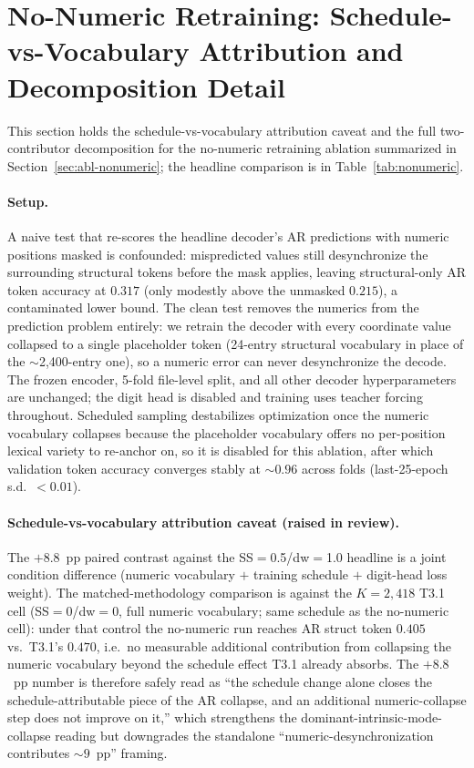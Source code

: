 \documentclass[11pt,a4paper]{article}
\begin{document}
\section{No-Numeric Retraining: Schedule-vs-Vocabulary Attribution and Decomposition Detail}
\label{app:nonumeric-detail}

This section holds the schedule-vs-vocabulary attribution caveat and the full
two-contributor decomposition for the no-numeric retraining ablation summarized
in Section~\ref{sec:abl-nonumeric}; the headline comparison is in
Table~\ref{tab:nonumeric}.

\paragraph{Setup.} A naive test that re-scores the headline decoder's AR predictions with numeric positions masked is confounded: mispredicted values still desynchronize the surrounding structural tokens before the mask applies, leaving structural-only AR token accuracy at $0.317$ (only modestly above the unmasked $0.215$), a contaminated lower bound. The clean test removes the numerics from the prediction problem entirely: we retrain the decoder with every coordinate value collapsed to a single placeholder token (24-entry structural vocabulary in place of the $\sim$2{,}400-entry one), so a numeric error can never desynchronize the decode. The frozen encoder, 5-fold file-level split, and all other decoder hyperparameters are unchanged; the digit head is disabled and training uses teacher forcing throughout. Scheduled sampling destabilizes optimization once the numeric vocabulary collapses because the placeholder vocabulary offers no per-position lexical variety to re-anchor on, so it is disabled for this ablation, after which validation token accuracy converges stably at $\sim$$0.96$ across folds (last-25-epoch s.d.\ $<\!0.01$).

\paragraph{Schedule-vs-vocabulary attribution caveat (raised in review).} The $+8.8$~pp paired contrast against the SS$=$0.5/dw$=$1.0 headline is a joint condition difference (numeric vocabulary $+$ training schedule $+$ digit-head loss weight). The matched-methodology comparison is against the $K\!=\!2{,}418$ T3.1 cell (SS$=$0/dw$=$0, full numeric vocabulary; same schedule as the no-numeric cell): under that control the no-numeric run reaches AR struct token $0.405$ vs.\ T3.1's $0.470$, i.e.\ no measurable additional contribution from collapsing the numeric vocabulary beyond the schedule effect T3.1 already absorbs. The $+8.8$~pp number is therefore safely read as ``the schedule change alone closes the schedule-attributable piece of the AR collapse, and an additional numeric-collapse step does not improve on it,'' which strengthens the dominant-intrinsic-mode-collapse reading but downgrades the standalone ``numeric-desynchronization contributes $\sim\!9$~pp'' framing.
\end{document}
